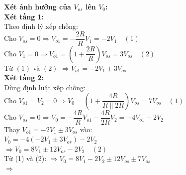 \begin{flushleft}
\textbf{Xét ảnh hưởng của $V_{os}$ lên $V_0$:} \\[8pt]

\textbf{Xét tầng 1:} \\[4pt]
Theo định lý xếp chồng: \\[2pt]
Cho $V_{os} = 0 \Rightarrow V_{o1} = -\dfrac{2R}{R}V_1 = -2V_1 \quad (1)$ \\[6pt]
Cho $V_1 = 0 \Rightarrow V_{o1} = \left(1 + \dfrac{2R}{R}\right)V_{os} = 3V_{os} \quad (2)$ \\[8pt]
Từ $(1)$ và $(2)$ $\Rightarrow V_{o1} = -2V_1 \pm 3V_{os}$ \\[10pt]

\textbf{Xét tầng 2:} \\[4pt]
Dùng định luật xếp chồng: \\[4pt]
Cho $V_{o1} = V_2 = 0 \Rightarrow V_0 = \left(1 + \dfrac{4R}{R \parallel 2R}\right)V_{os} = 7V_{os} \quad (1)$ \\[8pt]
Cho $V_{os} = 0 \Rightarrow V_0 = -\dfrac{4R}{R}V_{o1} - \dfrac{4R}{2R}V_2 = -4V_{o1} - 2V_2$ \\[8pt]
Thay $V_{o1} = -2V_1 \pm 3V_{os}$ vào: \\[4pt]
$V_0 = -4(-2V_1 \pm 3V_{os}) - 2V_2$ \\[6pt]
$\Rightarrow V_0 = 8V_1 \pm 12V_{os} - 2V_2 \quad (2)$ \\[10pt]
Từ (1) và (2): $\Rightarrow V_0 = 8V_1 - 2V_2 \pm 12V_{os} \pm 7V_{os}$ \\[4pt]
$\Rightarrow$ 
\end{flushleft}


